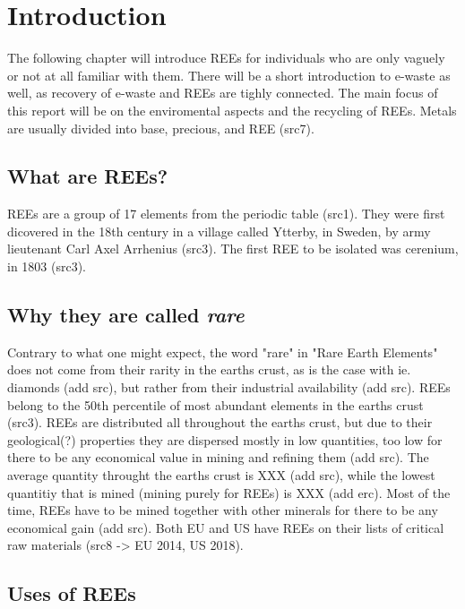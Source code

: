 
\section{Introduction}

The following chapter will introduce REEs for individuals who are only vaguely or not at all familiar with them. There will be a short introduction to e-waste as well, as recovery of e-waste and REEs are tighly connected. The main focus of this report will be on the enviromental aspects and the recycling of REEs. Metals are usually divided into base, precious, and REE (src7).

\subsection{What are REEs?}

REEs are a group of 17 elements from the periodic table (src1). They were first dicovered in the 18th century in a village called Ytterby, in Sweden, by army lieutenant Carl Axel Arrhenius (src3). The first REE to be isolated was cerenium, in 1803 (src3).

\subsection{Why they are called \textit{rare}}

Contrary to what one might expect, the word "rare" in "Rare Earth Elements" does not come from their rarity in the earths crust, as is the case with ie. diamonds (add src), but rather from their industrial availability (add src). REEs belong to the 50th percentile of most abundant elements in the earths crust (src3). REEs are distributed all throughout the earths crust, but due to their geological(?) properties they are dispersed mostly in low quantities, too low for there to be any economical value in mining and refining them (add src). The average quantity throught the earths crust is XXX (add src), while the lowest quantitiy that is mined (mining purely for REEs) is XXX (add erc). Most of the time, REEs have to be mined together with other minerals for there to be any economical gain (add src). Both EU and US have REEs on their lists of critical raw materials (src8 -> EU 2014, US 2018).

\subsection{Uses of REEs}

